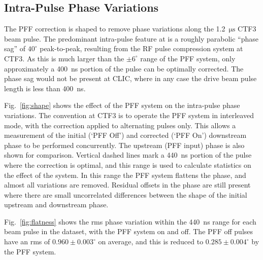\documentclass[%
 reprint,
 amsmath,amssymb,
 prl,
]{revtex4-1}
\begin{document}
\subsection{\label{ss:shape}Intra-Pulse Phase Variations}

The PFF correction is shaped to remove phase variations along the 
1.2~\(\mathrm{\mu s}\) CTF3 beam pulse. The predominant intra-pulse feature at 
is a roughly parabolic ``phase sag'' of \(40^\circ\) peak-to-peak, resulting 
from the RF pulse compression system at CTF3. As this is much larger than the 
\(\pm 6^\circ\) range of the PFF system, only approximately a 400~ns portion of 
the pulse can be optimally corrected. The phase sag would not be present at 
CLIC, where in any case the drive beam pulse length is less than 400~ns.



Fig.~\ref{fig:shape} shows the effect of the PFF system on the intra-pulse 
phase variations. The convention at CTF3 is to operate the PFF system in 
interleaved mode, with 
the correction applied to alternating pulses only. This allows a measurement of 
the initial (`PFF Off') and corrected (`PFF On') downstream phase to be 
performed concurrently. The upstream (PFF input) phase is also shown for 
comparison. Vertical dashed lines mark a 440~ns portion of the pulse where the 
correction is optimal, and this range is used to calculate statistics on the 
effect of the system. In this range the PFF system flattens the phase, 
and almost all variations are removed. Residual offsets in the phase are still 
present where there are small uncorrelated differences between the shape of the 
initial upstream and downstream phase.

Fig.~\ref{fig:flatness} shows the rms phase variation within the 440~ns range 
for each beam pulse in the dataset, with the PFF system on and off. The PFF off 
pulses have an rms of \(0.960\pm0.003^\circ\) on average, and this is reduced 
to \(0.285\pm0.004^\circ\) by the PFF system.


\end{document}
